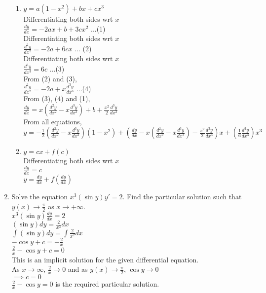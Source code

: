 \documentclass[a4paper]{article}
\begin{document}
\begin{enumerate}
\begin{enumerate}
\item{$y=a(1-x^2)+bx +cx^3$
\\Differentiating both sides wrt $x$
\\$\frac{dy}{dx}=-2ax+b+3cx^2$ ...(1)
\\Differentiating both sides wrt $x$
\\$\frac{d^2y}{dx^2}=-2a+6cx$ ... (2)
\\Differentiating both sides wrt $x$
\\$\frac{d^3y}{dx^3}=6c$ ...(3)
\\From (2) and (3),
\\$\frac{d^2y}{dx^2}=-2a+x\frac{d^3y}{dx^3}$ ...(4)
\\From (3), (4) and (1),
\\$\frac{dy}{dx}=x(\frac{d^2y}{dx^2}-x\frac{d^3y}{dx^3})+b+\frac{x^2}{2}\frac{d^3y}{dx^3}$
\\From all equations,
\\$y=-\frac{1}{2}(\frac{d^2y}{dx^2}-x\frac{d^3y}{dx^3})(1-x^2)+(\frac{dy}{dx}-x(\frac{d^2y}{dx^2}-x\frac{d^3y}{dx^3})-\frac{x^2}{2}\frac{d^3y}{dx^3})x+ (\frac{1}{6}\frac{d^3y}{dx^3}) x^3$
}

\item{$y=cx+f(c)$
\\Differentiating both sides wrt $x$
\\$\frac{dy}{dx}=c$
\\$y=\frac{dy}{dx}+f(\frac{dy}{dx})$

}
\end{enumerate}

\item{Solve the equation $x^3(\sin y)y' = 2$. Find the particular solution such that $y(x) \rightarrow  \frac{\pi}{2}$ as $x \rightarrow +\infty$.
\\$x^3(\sin y)\frac{dy}{dx}=2$
\\$(\sin y)dy=\frac{2}{x^3}dx$
\\$\int(\sin y)dy=\int\frac{2}{x^2}dx$
\\$-\cos y+c=-\frac{2}{x}$
\\$\frac{2}{x}-\cos y+c=0$
\\This is an implicit solution for the given differential equation.
\\As $x\rightarrow\infty$, $\frac{2}{x}\rightarrow 0$ and as $y(x) \rightarrow  \frac{\pi}{2}$, $\cos y\rightarrow 0$
\\$\implies c=0$
\\$\frac{2}{x}-\cos y=0$ is the required particular solution.
}


\end{enumerate}
\end{document}

